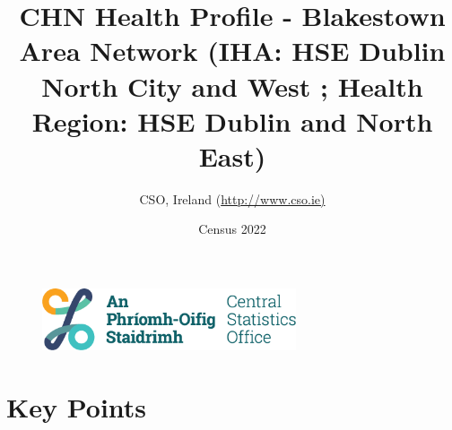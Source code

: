 \documentclass{article}
\title{CHN Health Profile - Blakestown Area Network (IHA: HSE Dublin North City and West ;  Health Region: HSE Dublin and North East) }
\date{Census 2022}
\author{CSO, Ireland  (\url{http://www.cso.ie)}}
\begin{document}


\begin{figure}
	\centering
\includegraphics[width =75mm]{../figures/CSO_Logo.png}
\end{figure}

				 
		   
						  
														  
																																													
												 
			 
\maketitle
					
													   
				 
						 
																																																																											   
				 
				  
  \pagebreak
    	    \tableofcontents

\pagebreak


\section{Key Points}
\end{document}
